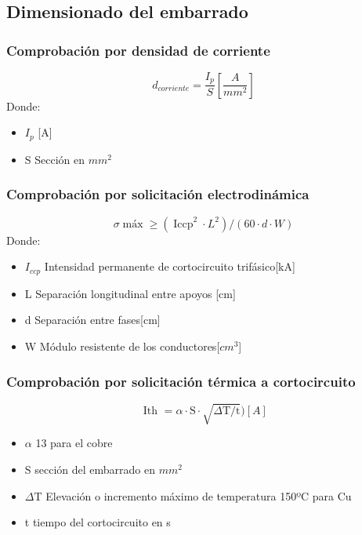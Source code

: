 \documentclass[10pt,a4paper]{article}
\begin{document}
\subsection{Dimensionado del embarrado}
\subsubsection{Comprobación por densidad de corriente}
$$
d_{corriente} = \frac{I_p}{S}[\frac{A}{mm^2}]
$$
Donde:
\begin{itemize}
    \item $I_p$ [A]
    \item S Sección en $mm^2$
\end{itemize}

\subsubsection{Comprobación por solicitación electrodinámica}
$$
\sigma \operatorname{máx} \geq\left(\operatorname{Iccp}^{2} \cdot L^{2}\right) /(60 \cdot d \cdot W)
$$
Donde:
\begin{itemize}
    \item $I_{ccp}$ Intensidad permanente de cortocircuito trifásico[kA]
    \item L Separación longitudinal entre apoyos [cm]
    \item d  Separación entre fases[cm]
    \item W  Módulo resistente de los conductores[$cm^3$]
\end{itemize}

\subsubsection{Comprobación por solicitación térmica a cortocircuito}
$$
\text { Ith }=\alpha \cdot \mathrm{S} \cdot \sqrt{ \Delta \mathrm{T} / \mathrm{t}}) [A]
$$
\begin{itemize}
    \item $\alpha$ 13 para el cobre
    \item S sección del embarrado en $mm^2$
    \item $\Delta \mathrm{T}$ Elevación o incremento máximo de temperatura 150ºC para Cu
    \item t tiempo del cortocircuito  en s
    
\end{itemize}
\newpage
\end{document}
